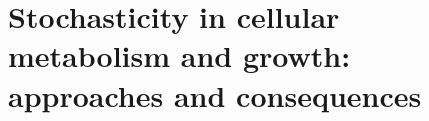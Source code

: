 \chapter{Stochasticity in cellular metabolism and growth: approaches and consequences}
\label{chapter:literaturereview}